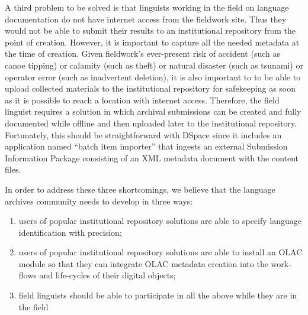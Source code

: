 A third problem to be solved is that linguists working in the
field on language documentation do not have internet access from
the fieldwork site. Thus they would not be able to submit their
results to an institutional repository from the point of creation.
However, it is important to capture all the needed metadata at the time
of  creation.  Given fieldwork's ever-present risk of accident (such as
canoe tipping) or calamity (such as theft) or natural disaster (such
as tsunami) or operator error (such as inadvertent deletion), it is
also important to to be able to upload
collected materials to the institutional repository for safekeeping
as soon as it is possible to reach a location with internet access.
Therefore, the field linguist requires a solution in which archival
submissions can be created and fully documented while offline and then uploaded later to the institutional repository. Fortunately, this
should be straightforward with DSpace since it includes an application
named ``batch item importer'' that ingests an external Submission Information Package consisting of an XML metadata document with the content files.


In order to address these three shortcomings, we believe that the
language archives community needs to develop in three ways:

\begin{enumerate}\setlength{\itemsep}{0pt}
\item users of popular institutional repository solutions are able
  to specify language identification with precision;

\item users of popular institutional repository solutions are
    able to install an OLAC module so that they can integrate OLAC
    metadata creation into the work-flows and life-cycles of their
    digital objects;

\item field linguists should be able to participate in all the
    above while they are in the field
\end{enumerate}


